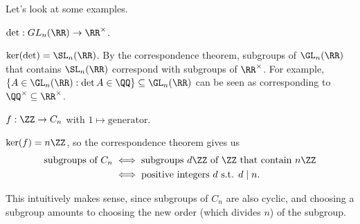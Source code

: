 Let's look at some examples.

\begin{example}
\exlabel

$\det : GL_n(\RR)\rightarrow \RR^\times$.
\end{example}
$\ker(\det) = \SL_n(\RR)$. By the correspondence theorem, subgroups of $\GL_n(\RR)$ that contains $\SL_n(\RR)$ correspond with subgroups of $\RR^\times$. For example, $\{A \in \GL_n(\RR) : \det A\in \QQ\}\subseteq \GL_n(\RR)$ can be seen as corresponding to $\QQ^\times\subseteq \RR^\times$. 

\begin{example}
\exlabel

$f:\ZZ\rightarrow C_n$ with $1\mapsto \text{generator}$.
\end{example}

$\ker(f) = n\ZZ$, so the correspondence theorem gives us
\begin{align*}
\text{subgroups of }C_n&\iff \text{subgroups }d\ZZ\text{ of }\ZZ\text{ that contain }n\ZZ \\
&\iff \text{positive integers }d\text{ s.t. }d\mid n.
\end{align*}

This intuitively makes sense, since subgroups of $C_n$ are also cyclic, and choosing a subgroup amounts to choosing the new order (which divides $n$) of the subgroup. 




